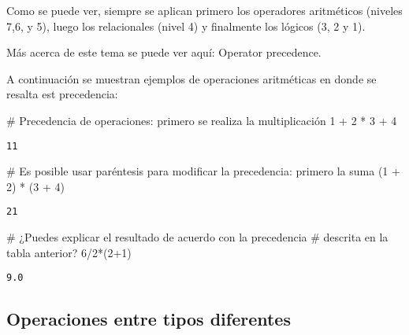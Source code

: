 \documentclass[
  letterpaper,
  DIV=11,
  numbers=noendperiod]{scrreprt}
\newenvironment{Shaded}{\begin{snugshade}}{\end{snugshade}}
\newcommand{\CommentTok}[1]{\textcolor[rgb]{0.37,0.37,0.37}{#1}}
\newcommand{\DecValTok}[1]{\textcolor[rgb]{0.68,0.00,0.00}{#1}}
\newcommand{\NormalTok}[1]{\textcolor[rgb]{0.00,0.23,0.31}{#1}}
\newcommand{\OperatorTok}[1]{\textcolor[rgb]{0.37,0.37,0.37}{#1}}
\begin{document}
Como se puede ver, siempre se aplican primero los operadores aritméticos
(niveles 7,6, y 5), luego los relacionales (nivel 4) y finalmente los
lógicos (3, 2 y 1).

Más acerca de este tema se puede ver aquí: Operator precedence.

A continuación se muestran ejemplos de operaciones aritméticas en donde
se resalta est precedencia:

\begin{Shaded}
\begin{Highlighting}[]
\CommentTok{\# Precedencia de operaciones: primero se realiza la multiplicación}
\DecValTok{1} \OperatorTok{+} \DecValTok{2} \OperatorTok{*} \DecValTok{3} \OperatorTok{+} \DecValTok{4}
\end{Highlighting}
\end{Shaded}

\begin{verbatim}
11
\end{verbatim}

\begin{Shaded}
\begin{Highlighting}[]
\CommentTok{\# Es posible usar paréntesis para modificar la precedencia: primero la suma}
\NormalTok{(}\DecValTok{1} \OperatorTok{+} \DecValTok{2}\NormalTok{) }\OperatorTok{*}\NormalTok{ (}\DecValTok{3} \OperatorTok{+} \DecValTok{4}\NormalTok{)}
\end{Highlighting}
\end{Shaded}

\begin{verbatim}
21
\end{verbatim}

\begin{Shaded}
\begin{Highlighting}[]
\CommentTok{\# ¿Puedes explicar el resultado de acuerdo con la precedencia}
\CommentTok{\# descrita en la tabla anterior?}
\DecValTok{6}\OperatorTok{/}\DecValTok{2}\OperatorTok{*}\NormalTok{(}\DecValTok{2}\OperatorTok{+}\DecValTok{1}\NormalTok{) }
\end{Highlighting}
\end{Shaded}

\begin{verbatim}
9.0
\end{verbatim}

\subsection{Operaciones entre tipos
diferentes}\label{operaciones-entre-tipos-diferentes}
\end{document}
